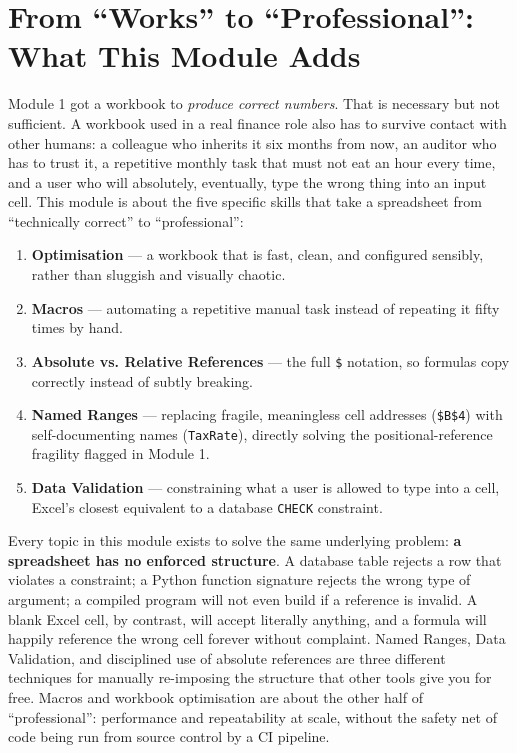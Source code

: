 \documentclass[11pt,a4paper]{article}
\begin{document}
\section{From ``Works'' to ``Professional'': What This Module Adds}

Module 1 got a workbook to \emph{produce correct numbers}. That is necessary but not sufficient. A workbook used in a real finance role also has to survive contact with other humans: a colleague who inherits it six months from now, an auditor who has to trust it, a repetitive monthly task that must not eat an hour every time, and a user who will absolutely, eventually, type the wrong thing into an input cell. This module is about the five specific skills that take a spreadsheet from ``technically correct'' to ``professional'':

\begin{enumerate}
  \item \textbf{Optimisation} --- a workbook that is fast, clean, and configured sensibly, rather than sluggish and visually chaotic.
  \item \textbf{Macros} --- automating a repetitive manual task instead of repeating it fifty times by hand.
  \item \textbf{Absolute vs. Relative References} --- the full \texttt{\$} notation, so formulas copy correctly instead of subtly breaking.
  \item \textbf{Named Ranges} --- replacing fragile, meaningless cell addresses (\texttt{\$B\$4}) with self-documenting names (\texttt{TaxRate}), directly solving the positional-reference fragility flagged in Module 1.
  \item \textbf{Data Validation} --- constraining what a user is allowed to type into a cell, Excel's closest equivalent to a database \texttt{CHECK} constraint.
\end{enumerate}

\begin{keyconcept}
Every topic in this module exists to solve the same underlying problem: \textbf{a spreadsheet has no enforced structure}. A database table rejects a row that violates a constraint; a Python function signature rejects the wrong type of argument; a compiled program will not even build if a reference is invalid. A blank Excel cell, by contrast, will accept literally anything, and a formula will happily reference the wrong cell forever without complaint. Named Ranges, Data Validation, and disciplined use of absolute references are three different techniques for manually re-imposing the structure that other tools give you for free. Macros and workbook optimisation are about the other half of ``professional'': performance and repeatability at scale, without the safety net of code being run from source control by a CI pipeline.
\end{keyconcept}
\end{document}
